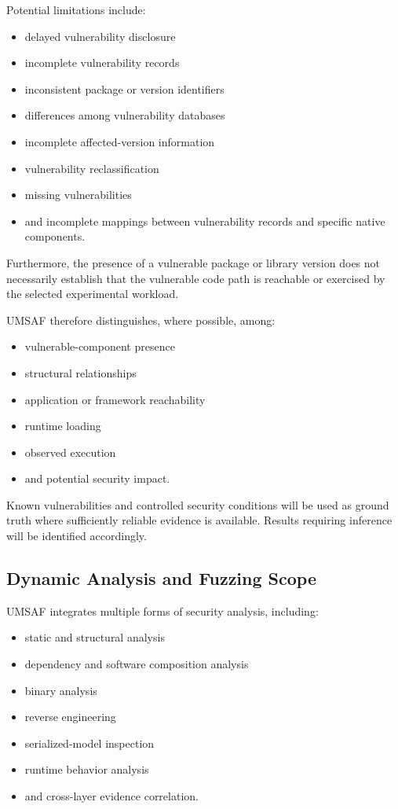 \documentclass[
  12pt,
  letterpaper,
  oneside]{report}
\providecommand{\tightlist}{%
  \setlength{\itemsep}{0pt}\setlength{\parskip}{0pt}}
\begin{document}
Potential limitations include:

\begin{itemize}
\tightlist
\item
  delayed vulnerability disclosure
\item
  incomplete vulnerability records
\item
  inconsistent package or version identifiers
\item
  differences among vulnerability databases
\item
  incomplete affected-version information
\item
  vulnerability reclassification
\item
  missing vulnerabilities
\item
  and incomplete mappings between vulnerability records and specific
  native components.
\end{itemize}

Furthermore, the presence of a vulnerable package or library version
does not necessarily establish that the vulnerable code path is
reachable or exercised by the selected experimental workload.

UMSAF therefore distinguishes, where possible, among:

\begin{itemize}
\tightlist
\item
  vulnerable-component presence
\item
  structural relationships
\item
  application or framework reachability
\item
  runtime loading
\item
  observed execution
\item
  and potential security impact.
\end{itemize}

Known vulnerabilities and controlled security conditions will be used as
ground truth where sufficiently reliable evidence is available. Results
requiring inference will be identified accordingly.

\subsection{Dynamic Analysis and Fuzzing Scope}\label{1315-dynamic-analysis-and-fuzzing-scope}

UMSAF integrates multiple forms of security analysis, including:

\begin{itemize}
\tightlist
\item
  static and structural analysis
\item
  dependency and software composition analysis
\item
  binary analysis
\item
  reverse engineering
\item
  serialized-model inspection
\item
  runtime behavior analysis
\item
  and cross-layer evidence correlation.
\end{itemize}
\end{document}
